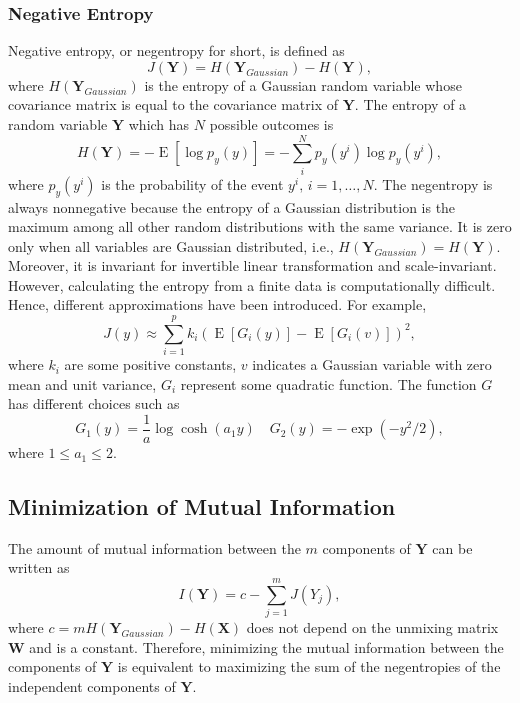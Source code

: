 \subsubsection{Negative Entropy\label{Sec:DR:ICA:MnG:ne}}
Negative entropy, or negentropy for short, is defined as
\begin{equation}
	J(\mathbf{Y})=H(\mathbf{Y}_{Gaussian})-H(\mathbf{Y}),
\end{equation}
where $H(\mathbf{Y}_{Gaussian})$ is the entropy of a Gaussian random variable whose covariance matrix is equal to the covariance matrix of $\mathbf{Y}$. The entropy of a random variable $\mathbf{Y}$ which has $N$ possible outcomes is
\begin{equation}
	H(\mathbf{Y})=-\operatorname{E}\left[\log{p_y(y)}\right]=-\sum_i^N p_y(y^i)\log{p_y(y^i)},
\end{equation}
where $p_y(y^i)$ is the probability of the event $y^i,\, i=1,\dots, N$. The negentropy is always nonnegative because the entropy of a Gaussian distribution is the maximum among all other random distributions with the same variance. It is zero only when all variables are Gaussian distributed, i.e., $H(\mathbf{Y}_{Gaussian})=H(\mathbf{Y})$. Moreover, it is invariant for invertible linear transformation and scale-invariant. However, calculating the entropy from a finite data is computationally difficult. Hence, different approximations have been introduced. For example,
\begin{equation}
	J(y)\approx \sum_{i=1}^p k_i\left({\operatorname{E}}\left[G_i(y)\right]-{\operatorname{E}}\left[G_i(v)\right]\right)^2,
\end{equation} 
where $k_i$ are some positive constants, $v$ indicates a Gaussian variable with zero mean and unit variance, $G_i$ represent some quadratic function. The function $G$ has different choices such as
\begin{equation}
	G_1(y)=\frac{1}{a}\log\cosh (a_1y) \quad G_2(y)=-\exp(-y^2/2),
\end{equation}
where $1\leq a_1 \leq 2$.

\subsection{Minimization of Mutual Information\label{Sec:DR:ICA:MMI}}
The amount of mutual information between the $m$ components of $\mathbf{Y}$ can be written as
\begin{equation}
	I(\mathbf{Y})=c-\sum_{j=1}^m J(Y_j),
\end{equation}
where $c=mH(\mathbf{Y}_{Gaussian})-H(\mathbf{X})$ does not depend on the unmixing matrix $\mathbf{W}$ and is a constant. Therefore, minimizing the mutual information between the components of $\mathbf{Y}$ is equivalent to maximizing the sum of the negentropies of the independent components of $\mathbf{Y}$.

